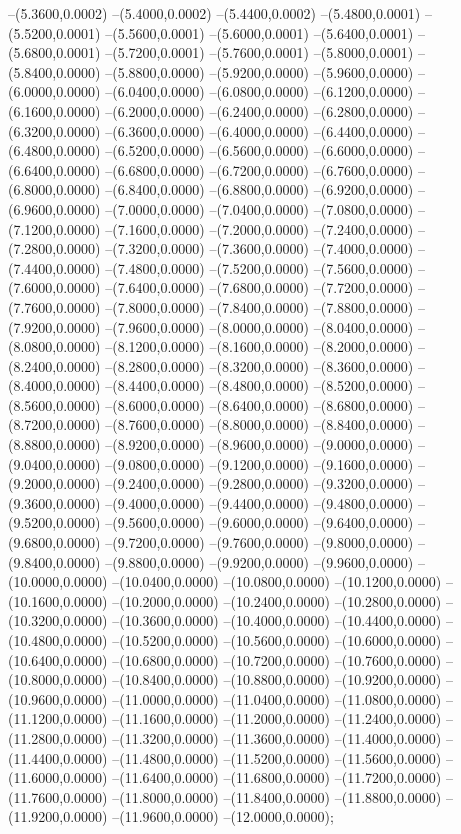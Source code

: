 {	--(5.3600,0.0002)
	--(5.4000,0.0002)
	--(5.4400,0.0002)
	--(5.4800,0.0001)
	--(5.5200,0.0001)
	--(5.5600,0.0001)
	--(5.6000,0.0001)
	--(5.6400,0.0001)
	--(5.6800,0.0001)
	--(5.7200,0.0001)
	--(5.7600,0.0001)
	--(5.8000,0.0001)
	--(5.8400,0.0000)
	--(5.8800,0.0000)
	--(5.9200,0.0000)
	--(5.9600,0.0000)
	--(6.0000,0.0000)
	--(6.0400,0.0000)
	--(6.0800,0.0000)
	--(6.1200,0.0000)
	--(6.1600,0.0000)
	--(6.2000,0.0000)
	--(6.2400,0.0000)
	--(6.2800,0.0000)
	--(6.3200,0.0000)
	--(6.3600,0.0000)
	--(6.4000,0.0000)
	--(6.4400,0.0000)
	--(6.4800,0.0000)
	--(6.5200,0.0000)
	--(6.5600,0.0000)
	--(6.6000,0.0000)
	--(6.6400,0.0000)
	--(6.6800,0.0000)
	--(6.7200,0.0000)
	--(6.7600,0.0000)
	--(6.8000,0.0000)
	--(6.8400,0.0000)
	--(6.8800,0.0000)
	--(6.9200,0.0000)
	--(6.9600,0.0000)
	--(7.0000,0.0000)
	--(7.0400,0.0000)
	--(7.0800,0.0000)
	--(7.1200,0.0000)
	--(7.1600,0.0000)
	--(7.2000,0.0000)
	--(7.2400,0.0000)
	--(7.2800,0.0000)
	--(7.3200,0.0000)
	--(7.3600,0.0000)
	--(7.4000,0.0000)
	--(7.4400,0.0000)
	--(7.4800,0.0000)
	--(7.5200,0.0000)
	--(7.5600,0.0000)
	--(7.6000,0.0000)
	--(7.6400,0.0000)
	--(7.6800,0.0000)
	--(7.7200,0.0000)
	--(7.7600,0.0000)
	--(7.8000,0.0000)
	--(7.8400,0.0000)
	--(7.8800,0.0000)
	--(7.9200,0.0000)
	--(7.9600,0.0000)
	--(8.0000,0.0000)
	--(8.0400,0.0000)
	--(8.0800,0.0000)
	--(8.1200,0.0000)
	--(8.1600,0.0000)
	--(8.2000,0.0000)
	--(8.2400,0.0000)
	--(8.2800,0.0000)
	--(8.3200,0.0000)
	--(8.3600,0.0000)
	--(8.4000,0.0000)
	--(8.4400,0.0000)
	--(8.4800,0.0000)
	--(8.5200,0.0000)
	--(8.5600,0.0000)
	--(8.6000,0.0000)
	--(8.6400,0.0000)
	--(8.6800,0.0000)
	--(8.7200,0.0000)
	--(8.7600,0.0000)
	--(8.8000,0.0000)
	--(8.8400,0.0000)
	--(8.8800,0.0000)
	--(8.9200,0.0000)
	--(8.9600,0.0000)
	--(9.0000,0.0000)
	--(9.0400,0.0000)
	--(9.0800,0.0000)
	--(9.1200,0.0000)
	--(9.1600,0.0000)
	--(9.2000,0.0000)
	--(9.2400,0.0000)
	--(9.2800,0.0000)
	--(9.3200,0.0000)
	--(9.3600,0.0000)
	--(9.4000,0.0000)
	--(9.4400,0.0000)
	--(9.4800,0.0000)
	--(9.5200,0.0000)
	--(9.5600,0.0000)
	--(9.6000,0.0000)
	--(9.6400,0.0000)
	--(9.6800,0.0000)
	--(9.7200,0.0000)
	--(9.7600,0.0000)
	--(9.8000,0.0000)
	--(9.8400,0.0000)
	--(9.8800,0.0000)
	--(9.9200,0.0000)
	--(9.9600,0.0000)
	--(10.0000,0.0000)
	--(10.0400,0.0000)
	--(10.0800,0.0000)
	--(10.1200,0.0000)
	--(10.1600,0.0000)
	--(10.2000,0.0000)
	--(10.2400,0.0000)
	--(10.2800,0.0000)
	--(10.3200,0.0000)
	--(10.3600,0.0000)
	--(10.4000,0.0000)
	--(10.4400,0.0000)
	--(10.4800,0.0000)
	--(10.5200,0.0000)
	--(10.5600,0.0000)
	--(10.6000,0.0000)
	--(10.6400,0.0000)
	--(10.6800,0.0000)
	--(10.7200,0.0000)
	--(10.7600,0.0000)
	--(10.8000,0.0000)
	--(10.8400,0.0000)
	--(10.8800,0.0000)
	--(10.9200,0.0000)
	--(10.9600,0.0000)
	--(11.0000,0.0000)
	--(11.0400,0.0000)
	--(11.0800,0.0000)
	--(11.1200,0.0000)
	--(11.1600,0.0000)
	--(11.2000,0.0000)
	--(11.2400,0.0000)
	--(11.2800,0.0000)
	--(11.3200,0.0000)
	--(11.3600,0.0000)
	--(11.4000,0.0000)
	--(11.4400,0.0000)
	--(11.4800,0.0000)
	--(11.5200,0.0000)
	--(11.5600,0.0000)
	--(11.6000,0.0000)
	--(11.6400,0.0000)
	--(11.6800,0.0000)
	--(11.7200,0.0000)
	--(11.7600,0.0000)
	--(11.8000,0.0000)
	--(11.8400,0.0000)
	--(11.8800,0.0000)
	--(11.9200,0.0000)
	--(11.9600,0.0000)
	--(12.0000,0.0000);
}
